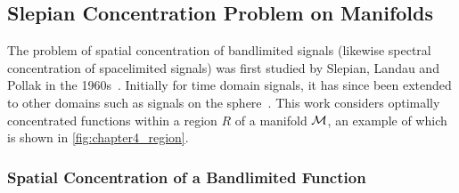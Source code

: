 \subsection{Slepian Concentration Problem on Manifolds}\label{sec:chapter4_slepian_concentration_problem_manifolds}

The problem of spatial concentration of bandlimited signals (likewise spectral concentration of spacelimited signals) was first studied by Slepian, Landau and Pollak in the 1960s~\cite{Slepian1961,Landau1961,Landau1962}.
Initially for time domain signals, it has since been extended to other domains such as signals on the sphere~\cite{Simons2006,Roddy2021a,Xu1983,Wieczorek2005}.
This work considers optimally concentrated functions within a region \(R\) of a manifold \(\mathcal{M}{}\), an example of which is shown in \cref{fig:chapter4_region}.



\subsubsection{Spatial Concentration of a Bandlimited Function}

